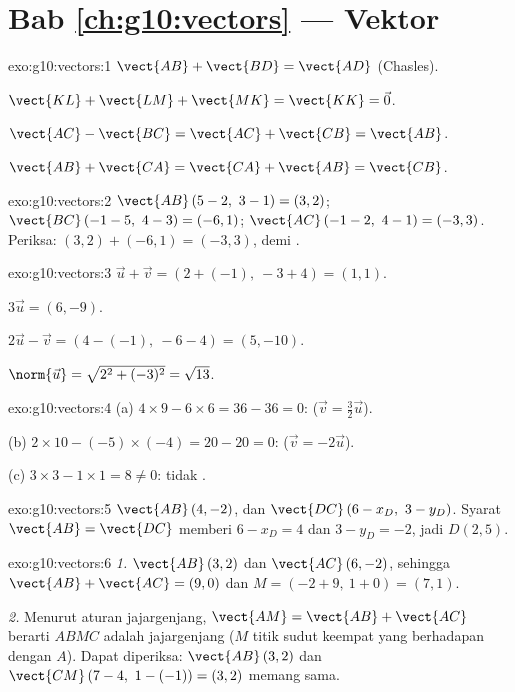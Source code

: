 \section*{Bab \ref{ch:g10:vectors} --- Vektor}

\begin{solution}{exo:g10:vectors:1}
$\vect{AB} + \vect{BD} = \vect{AD}$ (Chasles).

$\vect{KL} + \vect{LM} + \vect{MK} = \vect{KK} = \vec 0$.

$\vect{AC} - \vect{BC} = \vect{AC} + \vect{CB} = \vect{AB}$.

$\vect{AB} + \vect{CA} = \vect{CA} + \vect{AB} = \vect{CB}$.
\end{solution}

\begin{solution}{exo:g10:vectors:2}
$\vect{AB}\,(5-2,\ 3-1) = (3, 2)$; \quad
$\vect{BC}\,(-1-5,\ 4-3) = (-6, 1)$; \quad
$\vect{AC}\,(-1-2,\ 4-1) = (-3, 3)$.
Periksa: $(3, 2) + (-6, 1) = (-3, 3)$,  demi .
\end{solution}

\begin{solution}{exo:g10:vectors:3}
$\vec u + \vec v = (2 + (-1),\ -3 + 4) = (1, 1)$.

$3\vec u = (6, -9)$.

$2\vec u - \vec v = (4 - (-1),\ -6 - 4) = (5, -10)$.

$\norm{\vec u} = \sqrt{2^2 + (-3)^2} = \sqrt{13}$.
\end{solution}

\begin{solution}{exo:g10:vectors:4}
(a) $4 \times 9 - 6 \times 6 = 36 - 36 = 0$: 
($\vec v = \frac32 \vec u$).

(b) $2 \times 10 - (-5) \times (-4) = 20 - 20 = 0$: 
($\vec v = -2\vec u$).

(c) $3 \times 3 - 1 \times 1 = 8 \neq 0$: tidak .
\end{solution}

\begin{solution}{exo:g10:vectors:5}
$\vect{AB}\,(4, -2)$, dan $\vect{DC}\,(6 - x_D,\ 3 - y_D)$. Syarat
$\vect{AB} = \vect{DC}$ memberi $6 - x_D = 4$ dan $3 - y_D = -2$, jadi
$D(2, 5)$.
\end{solution}

\begin{solution}{exo:g10:vectors:6}
\emph{1.} $\vect{AB}\,(3, 2)$ dan $\vect{AC}\,(6, -2)$, sehingga
$\vect{AB} + \vect{AC} = (9, 0)$ dan
$M = (-2 + 9,\ 1 + 0) = (7, 1)$.

\emph{2.} Menurut aturan jajargenjang, $\vect{AM} = \vect{AB} + \vect{AC}$
berarti $ABMC$ adalah jajargenjang ($M$ titik sudut keempat yang berhadapan
dengan $A$). Dapat diperiksa: $\vect{AB}\,(3,2)$ dan
$\vect{CM}\,(7-4,\ 1-(-1)) = (3, 2)$ memang sama.
\end{solution}

